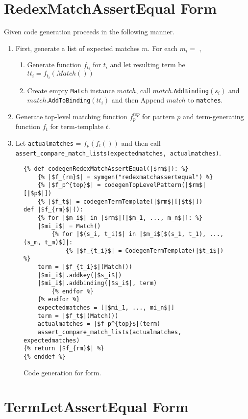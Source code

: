 \section{RedexMatchAssertEqual Form}
Given \RedexMatchAssertEqual code generation proceeds in the following manner.

\begin{enumerate}
\item First, generate a list of expected matches $m$. For each $m_i =$ \Match,
\begin{enumerate}
\item Generate function $f_{t_i}$ for $t_i$ and let resulting term be $tt_i = f_{t_i}(Match())$
\item Create empty \texttt{Match} instance $match$, call $match$.\texttt{AddBinding}$(s_i)$ and $match$.\texttt{AddToBinding}$(tt_i)$ and then Append $match$ to \texttt{matches}.
\end{enumerate}
\item Generate top-level matching function $f_p^{top}$ for pattern $p$ and term-generating function $f_t$ for term-template $t$.
\item Let \texttt{actualmatches} = $f_p(f_t())$ and then call \texttt{assert\_compare\_match\_lists(expectedmatches, actualmatches)}.
\end{enumerate}

\begin{figure}[h]
\begin{verbatim}
{% def codegenRedexMatchAssertEqual(|$rm$|): %}
	{% |$f_{rm}$| = symgen("redexmatchassertequal") %}
	{% |$f_p^{top}$| = codegenTopLevelPattern(|$rm$|[|$p$|])
	{% |$f_t$| = codegenTermTemplate(|$rm$|[|$t$|])
def |$f_{rm}$|():
	{% for |$m_i$| in |$rm$|[|$m_1, ..., m_n$|]: %}
	|$mi_i$| = Match()
		{% for |$(s_i, t_i)$| in |$m_i$[$(s_1, t_1), ..., (s_m, t_m)$]|:
			{% |$f_{t_i}$| = CodegenTermTemplate(|$t_i$|) %}
	term = |$f_{t_i}$|(Match())
	|$mi_i$|.addkey(|$s_i$|)
	|$mi_i$|.addbinding(|$s_i$|, term)
		{% endfor %}
	{% endfor %}
	expectedmatches = [|$mi_1, ..., mi_n$|]
	term = |$f_t$|(Match())
	actualmatches = |$f_p^{top}$|(term)
	assert_compare_match_lists(actualmatches, expectedmatches)
{% return |$f_{rm}$| %}
{% enddef %}
\end{verbatim}
\caption{Code generation for \RedexMatchAssertEqualNoArgs \space form.}
\label{codegen-redexmatch}
\end{figure}

\section{TermLetAssertEqual Form}

